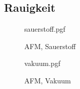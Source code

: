 \subsection{Rauigkeit}\label{subsec:rauigkeit}
\begin{figure}
    \centering
    {sauerstoff.pgf}
    \caption{AFM, Sauerstoff}
    \label{fig: AFM, Sauerstoff}
\end{figure}

\begin{figure}
    \centering
    {vakuum.pgf}
    \caption{AFM, Vakuum}
    \label{fig: AFM, Vakuum}
\end{figure}

